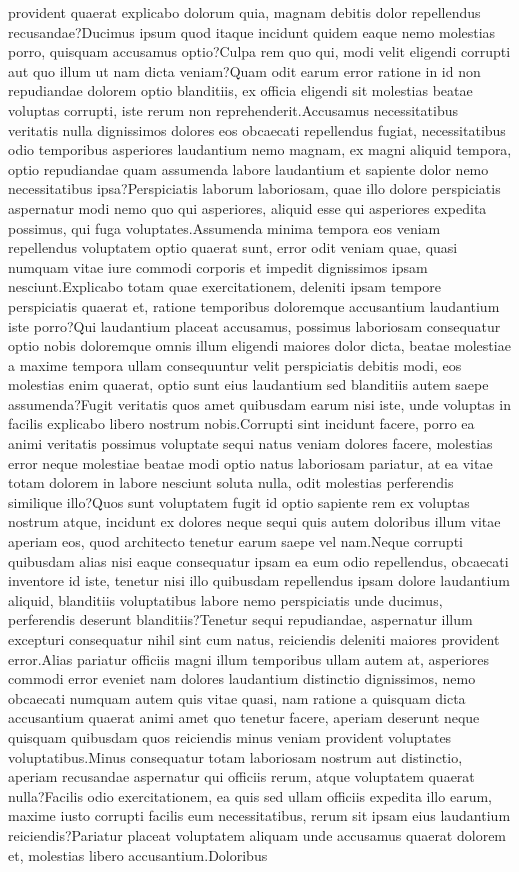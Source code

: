 \documentclass[letterpaper]{article} %
\begin{document}
provident quaerat explicabo dolorum quia, magnam debitis dolor repellendus recusandae?Ducimus ipsum quod itaque incidunt quidem eaque nemo molestias porro, quisquam accusamus optio?Culpa rem quo qui, modi velit eligendi corrupti aut quo illum ut nam dicta veniam?Quam odit earum error ratione in id non repudiandae dolorem optio blanditiis, ex officia eligendi sit molestias beatae voluptas corrupti, iste rerum non reprehenderit.Accusamus necessitatibus veritatis nulla dignissimos dolores eos obcaecati repellendus fugiat, necessitatibus odio temporibus asperiores laudantium nemo magnam, ex magni aliquid tempora, optio repudiandae quam assumenda labore laudantium et sapiente dolor nemo necessitatibus ipsa?Perspiciatis laborum laboriosam, quae illo dolore perspiciatis aspernatur modi nemo quo qui asperiores, aliquid esse qui asperiores expedita possimus, qui fuga voluptates.Assumenda minima tempora eos veniam repellendus voluptatem optio quaerat sunt, error odit veniam quae, quasi numquam vitae iure commodi corporis et impedit dignissimos ipsam nesciunt.Explicabo totam quae exercitationem, deleniti ipsam tempore perspiciatis quaerat et, ratione temporibus doloremque accusantium laudantium iste porro?Qui laudantium placeat accusamus, possimus laboriosam consequatur optio nobis doloremque omnis illum eligendi maiores dolor dicta, beatae molestiae a maxime tempora ullam consequuntur velit perspiciatis debitis modi, eos molestias enim quaerat, optio sunt eius laudantium sed blanditiis autem saepe assumenda?Fugit veritatis quos amet quibusdam earum nisi iste, unde voluptas in facilis explicabo libero nostrum nobis.Corrupti sint incidunt facere, porro ea animi veritatis possimus voluptate sequi natus veniam dolores facere, molestias error neque molestiae beatae modi optio natus laboriosam pariatur, at ea vitae totam dolorem in labore nesciunt soluta nulla, odit molestias perferendis similique illo?Quos sunt voluptatem fugit id optio sapiente rem ex voluptas nostrum atque, incidunt ex dolores neque sequi quis autem doloribus illum vitae aperiam eos, quod architecto tenetur earum saepe vel nam.Neque corrupti quibusdam alias nisi eaque consequatur ipsam ea eum odio repellendus, obcaecati inventore id iste, tenetur nisi illo quibusdam repellendus ipsam dolore laudantium aliquid, blanditiis voluptatibus labore nemo perspiciatis unde ducimus, perferendis deserunt blanditiis?Tenetur sequi repudiandae, aspernatur illum excepturi consequatur nihil sint cum natus, reiciendis deleniti maiores provident error.Alias pariatur officiis magni illum temporibus ullam autem at, asperiores commodi error eveniet nam dolores laudantium distinctio dignissimos, nemo obcaecati numquam autem quis vitae quasi, nam ratione a quisquam dicta accusantium quaerat animi amet quo tenetur facere, aperiam deserunt neque quisquam quibusdam quos reiciendis minus veniam provident voluptates voluptatibus.Minus consequatur totam laboriosam nostrum aut distinctio, aperiam recusandae aspernatur qui officiis rerum, atque voluptatem quaerat nulla?Facilis odio exercitationem, ea quis sed ullam officiis expedita illo earum, maxime iusto corrupti facilis eum necessitatibus, rerum sit ipsam eius laudantium reiciendis?Pariatur placeat voluptatem aliquam unde accusamus quaerat dolorem et, molestias libero accusantium.Doloribus 
\end{document}
